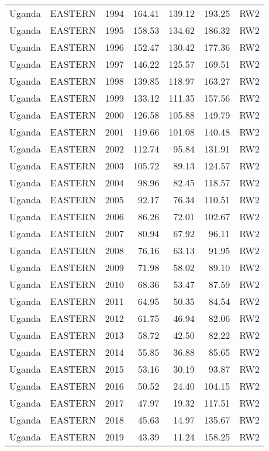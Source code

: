 \begin{longtable}{lllrrrl}
  Uganda & EASTERN & 1994 & 164.41 & 139.12 & 193.25 & RW2 \\ 
  Uganda & EASTERN & 1995 & 158.53 & 134.62 & 186.32 & RW2 \\ 
  Uganda & EASTERN & 1996 & 152.47 & 130.42 & 177.36 & RW2 \\ 
  Uganda & EASTERN & 1997 & 146.22 & 125.57 & 169.51 & RW2 \\ 
  Uganda & EASTERN & 1998 & 139.85 & 118.97 & 163.27 & RW2 \\ 
  Uganda & EASTERN & 1999 & 133.12 & 111.35 & 157.56 & RW2 \\ 
  Uganda & EASTERN & 2000 & 126.58 & 105.88 & 149.79 & RW2 \\ 
  Uganda & EASTERN & 2001 & 119.66 & 101.08 & 140.48 & RW2 \\ 
  Uganda & EASTERN & 2002 & 112.74 & 95.84 & 131.91 & RW2 \\ 
  Uganda & EASTERN & 2003 & 105.72 & 89.13 & 124.57 & RW2 \\ 
  Uganda & EASTERN & 2004 & 98.96 & 82.45 & 118.57 & RW2 \\ 
  Uganda & EASTERN & 2005 & 92.17 & 76.34 & 110.51 & RW2 \\ 
  Uganda & EASTERN & 2006 & 86.26 & 72.01 & 102.67 & RW2 \\ 
  Uganda & EASTERN & 2007 & 80.94 & 67.92 & 96.11 & RW2 \\ 
  Uganda & EASTERN & 2008 & 76.16 & 63.13 & 91.95 & RW2 \\ 
  Uganda & EASTERN & 2009 & 71.98 & 58.02 & 89.10 & RW2 \\ 
  Uganda & EASTERN & 2010 & 68.36 & 53.47 & 87.59 & RW2 \\ 
  Uganda & EASTERN & 2011 & 64.95 & 50.35 & 84.54 & RW2 \\ 
  Uganda & EASTERN & 2012 & 61.75 & 46.94 & 82.06 & RW2 \\ 
  Uganda & EASTERN & 2013 & 58.72 & 42.50 & 82.22 & RW2 \\ 
  Uganda & EASTERN & 2014 & 55.85 & 36.88 & 85.65 & RW2 \\ 
  Uganda & EASTERN & 2015 & 53.16 & 30.19 & 93.87 & RW2 \\ 
  Uganda & EASTERN & 2016 & 50.52 & 24.40 & 104.15 & RW2 \\ 
  Uganda & EASTERN & 2017 & 47.97 & 19.32 & 117.51 & RW2 \\ 
  Uganda & EASTERN & 2018 & 45.63 & 14.97 & 135.67 & RW2 \\ 
  Uganda & EASTERN & 2019 & 43.39 & 11.24 & 158.25 & RW2 \\ 

\end{longtable}
